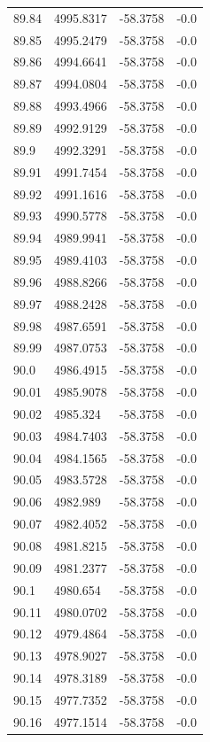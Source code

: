 \begin{table}[H]
\begin{tabular}{llll}
89.84 & 4995.8317 & -58.3758 & -0.0 \\
89.85 & 4995.2479 & -58.3758 & -0.0 \\
89.86 & 4994.6641 & -58.3758 & -0.0 \\
89.87 & 4994.0804 & -58.3758 & -0.0 \\
89.88 & 4993.4966 & -58.3758 & -0.0 \\
89.89 & 4992.9129 & -58.3758 & -0.0 \\
89.9 & 4992.3291 & -58.3758 & -0.0 \\
89.91 & 4991.7454 & -58.3758 & -0.0 \\
89.92 & 4991.1616 & -58.3758 & -0.0 \\
89.93 & 4990.5778 & -58.3758 & -0.0 \\
89.94 & 4989.9941 & -58.3758 & -0.0 \\
89.95 & 4989.4103 & -58.3758 & -0.0 \\
89.96 & 4988.8266 & -58.3758 & -0.0 \\
89.97 & 4988.2428 & -58.3758 & -0.0 \\
89.98 & 4987.6591 & -58.3758 & -0.0 \\
89.99 & 4987.0753 & -58.3758 & -0.0 \\
90.0 & 4986.4915 & -58.3758 & -0.0 \\
90.01 & 4985.9078 & -58.3758 & -0.0 \\
90.02 & 4985.324 & -58.3758 & -0.0 \\
90.03 & 4984.7403 & -58.3758 & -0.0 \\
90.04 & 4984.1565 & -58.3758 & -0.0 \\
90.05 & 4983.5728 & -58.3758 & -0.0 \\
90.06 & 4982.989 & -58.3758 & -0.0 \\
90.07 & 4982.4052 & -58.3758 & -0.0 \\
90.08 & 4981.8215 & -58.3758 & -0.0 \\
90.09 & 4981.2377 & -58.3758 & -0.0 \\
90.1 & 4980.654 & -58.3758 & -0.0 \\
90.11 & 4980.0702 & -58.3758 & -0.0 \\
90.12 & 4979.4864 & -58.3758 & -0.0 \\
90.13 & 4978.9027 & -58.3758 & -0.0 \\
90.14 & 4978.3189 & -58.3758 & -0.0 \\
90.15 & 4977.7352 & -58.3758 & -0.0 \\
90.16 & 4977.1514 & -58.3758 & -0.0 \\

\end{tabular}
\end{table}
